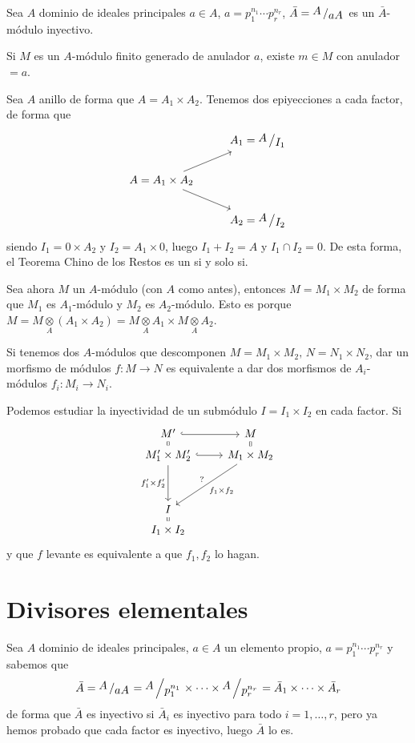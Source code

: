 \begin{cor}
    Sea $A$ dominio de ideales principales $a\in A$, $a=p_1^{n_1} \cdots p_r^{n_r}$, 
    $\bar A = \modulo{A}{aA}$ es un $\bar A$-m\'odulo inyectivo. 
\end{cor}
\begin{cor}
    Si $M$ es un $A$-m\'odulo finito generado de anulador $a$, existe $m \in M$ con anulador $=a$. 
\end{cor}
\begin{obs}
    Sea $A$ anillo de forma que $A=A_1\times A_2$. Tenemos dos epiyecciones a cada factor, de forma que 
    $$\bt & A_1 = \modulo{A}{I_1} \\
    A = A_1\times A_2 \arrow{ur} \arrow{dr} & \\ & A_2 = \modulo{A}{I_2}  \et$$
    siendo $I_1 = 0 \times A_2$ y $I_2 = A_1 \times 0$, luego $I_1+I_2 = A$ y $I_1 \cap I_2 = 0$. De esta forma, el Teorema Chino de los Restos es un si y solo si.

    Sea ahora $M$ un $A$-m\'odulo (con $A$ como antes), entonces $M=M_1\times M_2$ de forma que $M_1$ es $A_1$-m\'odulo y $M_2$ es $A_2$-m\'odulo. Esto es porque $M = M \underset{A}{\otimes} (A_1 \times A_2) = M \underset{A}{\otimes} A_1 \times M  \underset{A}{\otimes} A_2$. 

    Si tenemos dos $A$-m\'odulos que descomponen $M = M_1 \times M_2, \, N = N_1\times N_2$, dar un morfismo de m\'odulos $f: M \longrightarrow N$ es equivalente a dar dos morfismos de $A_i$-m\'odulos $f_i : M_i \longrightarrow N_i$. 

    Podemos estudiar la inyectividad de un subm\'odulo $I = I_1 \times I_2$  en cada factor. Si 
    $$\bt M' \arrow[equal]{d}\rar[hook] & M \arrow[equal]{d}\\[-5mm] M'_1 \times M_2' \arrow[swap]{d}{f_1' \times f_2'} \rar[hook] & M_1 \times M_2 \arrow{dl}{f_1\times f_2}[swap]{?} \\[5mm] I \arrow[equal]{d} \\[-5mm] I_1\times I_2  \et$$
    y que $f$ levante es equivalente a que $f_1, f_2$ lo hagan. 
\end{obs}
\section{Divisores elementales}
\begin{obs}
    Sea $A$ dominio de ideales principales, $a\in A$ un elemento propio, $a=p_1^{n_1} \cdots p_r^{n_r}$ y sabemos que 
    $$\bar A = \modulo{A}{aA} = \modulo{A}{p_1^{n_1}} \times \cdots \times\modulo{A}{p_r^{n_r}} = \bar A_1 \times \cdots \times \bar A_r$$
    de forma que $\bar A$ es inyectivo si $\bar A_i$ es inyectivo para todo $i=1,\ldots , r$, pero ya hemos probado que cada factor es inyectivo, luego $\bar A$ lo es. %
\end{obs}

